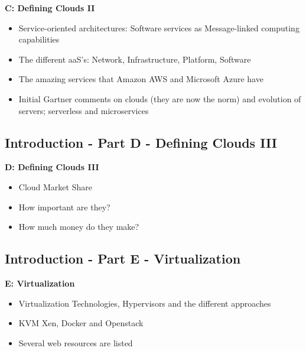 
\textbf{C: Defining Clouds II}

\begin{itemize}
\item Service-oriented architectures: Software services as
  Message-linked computing capabilities
\item The different aaS's: Network, Infrastructure, Platform, Software
\item The amazing services that Amazon AWS and Microsoft Azure have
\item Initial Gartner comments on clouds (they are now the norm) and
  evolution of servers; serverless and microservices

\end{itemize}

\subsection{Introduction - Part D - Defining Clouds III}\label{s:cloud-fundamentals-d}



\textbf{D: Defining Clouds III}
\begin{itemize}
\item Cloud Market Share
\item How important are they?
\item How much money do they make?
\end{itemize}

\subsection{Introduction - Part E - Virtualization}\label{s:cloud-fundamentals-e}

\textbf{E: Virtualization}
\begin{itemize}
\item Virtualization Technologies, Hypervisors and the different
  approaches
\item KVM Xen, Docker and Openstack
\item Several web resources are listed
\end{itemize}

